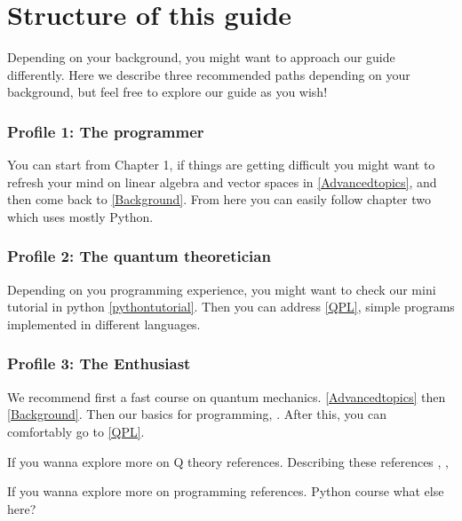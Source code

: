 

\chapter{Structure of this guide}

Depending on your background, you might want to approach our guide differently. Here we describe three recommended paths depending on your background, but feel free to explore our guide as you wish!

\subsection{Profile 1: The programmer}

You can start from Chapter 1, if things are getting difficult you might want to refresh your mind on linear algebra and vector spaces in \autoref{Advancedtopics}, and then come back to \autoref{Background}. From here you can easily follow chapter two which uses mostly Python.

\subsection{Profile 2: The quantum theoretician}

Depending on you programming experience, you might want to check our mini tutorial in python \autoref{pythontutorial}. Then you can address \autoref{QPL}, simple programs implemented in different languages.

\subsection{Profile 3: The Enthusiast}

We recommend first a fast course on quantum mechanics. \autoref{Advancedtopics} then \autoref{Background}. Then our basics for programming, %
. After this, you can comfortably go to \autoref{QPL}.

\vspace{1cm}

\noindent
If you wanna explore more on Q theory references. Describing these references \cite{nielsen_chuang_2010}, \cite{Preskill}, \cite{Watrous}

\noindent
If you wanna explore more on programming references. Python course \cite{PythonCourse} what else here?
